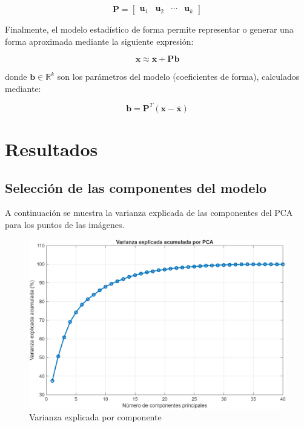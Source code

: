\documentclass[11pt, letterpaper]{article}
\begin{document}
$$
\mathbf{P} = \begin{bmatrix} \mathbf{u}_1 & \mathbf{u}_2 & \cdots & \mathbf{u}_k \end{bmatrix}
$$

Finalmente, el modelo estadístico de forma permite representar o generar una forma aproximada mediante la siguiente expresión:

$$
\mathbf{x} \approx \bar{\mathbf{x}} + \mathbf{P} \mathbf{b}
$$

donde \( \mathbf{b} \in \mathbb{R}^k \) son los parámetros del modelo (coeficientes de forma), calculados mediante:

$$
\mathbf{b} = \mathbf{P}^T (\mathbf{x} - \bar{\mathbf{x}})
$$




\newpage
	
\section{Resultados}

\subsection{Selección de las componentes del modelo}

A continuación se muestra la varianza explicada de las componentes del PCA para los puntos de las imágenes.


\begin{figure}[h!]
	\centering
	\begin{minipage}{1\textwidth}
		\centering
		\includegraphics[width=1\textwidth]{IMG/G1.png}
	\end{minipage}
	\caption{Varianza explicada por componente}
	\label{fig:f2}
\end{figure}
\end{document}
